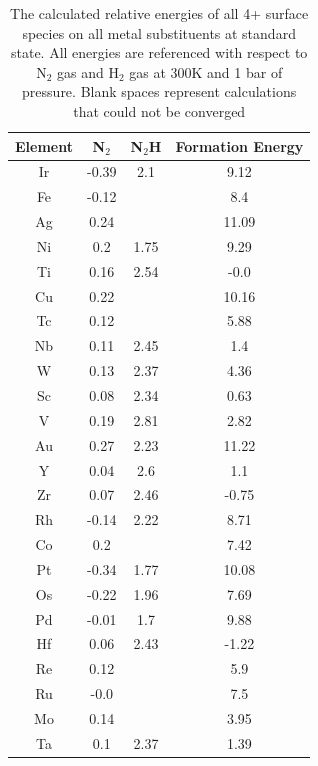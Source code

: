 \begin{table}
\begin{center}
\begin{tabular}{| c | c | c | c |}
\hline
Element & N$_2$ & N$_2$H & Formation Energy \\
\hline
Ir & -0.39 & 2.1 & 9.12 \\
Fe & -0.12 &  & 8.4 \\
Ag & 0.24 &  & 11.09 \\
Ni & 0.2 & 1.75 & 9.29 \\
Ti & 0.16 & 2.54 & -0.0 \\
Cu & 0.22 &  & 10.16 \\
Tc & 0.12 &  & 5.88 \\
Nb & 0.11 & 2.45 & 1.4 \\
W & 0.13 & 2.37 & 4.36 \\
Sc & 0.08 & 2.34 & 0.63 \\
V & 0.19 & 2.81 & 2.82 \\
Au & 0.27 & 2.23 & 11.22 \\
Y & 0.04 & 2.6 & 1.1 \\
Zr & 0.07 & 2.46 & -0.75 \\
Rh & -0.14 & 2.22 & 8.71 \\
Co & 0.2 &  & 7.42 \\
Pt & -0.34 & 1.77 & 10.08 \\
Os & -0.22 & 1.96 & 7.69 \\
Pd & -0.01 & 1.7 & 9.88 \\
Hf & 0.06 & 2.43 & -1.22 \\
Re & 0.12 &  & 5.9 \\
Ru & -0.0 &  & 7.5 \\
Mo & 0.14 &  & 3.95 \\
Ta & 0.1 & 2.37 & 1.39 \\
\hline
\end{tabular}
\end{center}
\label{table:4+_energies}
\caption{The calculated relative energies of all 4+ surface species on all metal substituents at standard state. All energies are referenced with respect to N$_2$ gas and H$_2$ gas at 300K and 1 bar of pressure. Blank spaces represent calculations that could not be converged}
\hline
\end{table}

